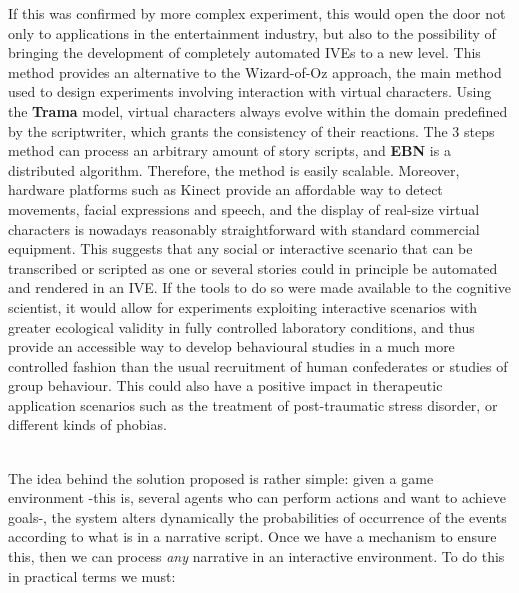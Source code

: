 \documentclass[
		twoside,openright,titlepage,numbers=noenddot,manychapters,
		headinclude,%
                footinclude=false,cleardoublepage=empty,
                BCOR=5mm,
		fontsize=11pt, %
                 enabledeprecatedfontcommands]{scrreprt}
\begin{document}
If this was confirmed by more complex experiment, this would open the door not only to applications in the entertainment industry, but also to the possibility of bringing the development of completely automated IVEs to a new level. This method provides an alternative to the Wizard-of-Oz approach, the main method used to design experiments involving interaction with virtual characters. Using the \textbf{Trama} model, virtual characters always evolve within the domain predefined by the scriptwriter, which grants the consistency of their reactions. The 3 steps method can process an arbitrary amount of story scripts, and \textbf{EBN} is a distributed algorithm. Therefore, the method is easily scalable. Moreover, hardware platforms such as Kinect  provide an affordable way to detect movements, facial expressions and speech, and the display of real-size virtual characters is nowadays reasonably straightforward with standard commercial equipment. This suggests that any social or interactive scenario that can be transcribed or scripted as one or several stories could in principle be automated and rendered in an IVE. If the tools to do so were made available to the cognitive scientist, it would allow for experiments exploiting interactive scenarios with greater ecological validity in fully controlled laboratory conditions, and thus provide an accessible way to develop behavioural studies in a much more controlled fashion than the usual recruitment of human confederates or studies of group behaviour. This could also have a positive impact in therapeutic application scenarios such as the treatment of post-traumatic stress disorder, or different kinds of phobias.
\\ \

The idea behind the solution proposed is rather simple: given a game environment -this is, several agents who can perform actions and want to achieve goals-, the system alters dynamically the probabilities of occurrence of the events according to what is in a narrative script. Once we have a mechanism to ensure this, then we can process \emph{any} narrative in an interactive environment. To do this in practical terms we must:
\end{document}
